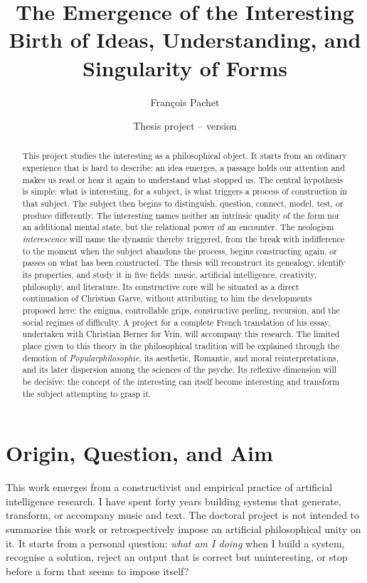 \documentclass[11pt,a4paper]{article}
\title{The Emergence of the Interesting\\
\large Birth of Ideas, Understanding, and Singularity of Forms}
\author{François Pachet}
\date{Thesis project -- version \projectversion\\\small \projectdate}
\begin{document}
\maketitle

\begin{abstract}
This project studies the interesting as a philosophical object. It
starts from an ordinary experience that is hard to describe: an idea emerges,
a passage holds our attention and makes us read or hear it again to understand
what stopped us. The central
hypothesis is simple: what is interesting, for a subject, is what triggers a
process of construction in that subject. The subject then begins to
distinguish, question, connect, model, test, or produce differently. The
interesting names neither an intrinsic quality of the form nor an additional
mental state, but the relational power of an encounter. The neologism
\emph{interescence} will name the dynamic thereby triggered, from the break with
indifference to the moment when the subject abandons the process, begins constructing
again, or passes on what has been constructed. The
thesis will reconstruct its genealogy, identify its properties, and study it
in five fields: music, artificial intelligence, creativity, philosophy, and
literature. Its constructive core will be situated as a direct continuation of
Christian Garve, without attributing to him the developments proposed here: the
enigma, controllable grips, constructive peeling, recursion, and the social
regimes of difficulty. A project for a complete French translation of
his essay, undertaken with Christian Berner for Vrin, will accompany this
research. The limited place given to this theory in the philosophical tradition
will be explained through the demotion of \emph{Popularphilosophie}, its
aesthetic, Romantic, and moral reinterpretations, and its later dispersion
among the sciences of the psyche.
Its reflexive dimension will be decisive: the concept of the interesting can
itself become interesting and transform the subject attempting to grasp it.
\end{abstract}

\section{Origin, Question, and Aim}

This work emerges from a constructivist and empirical practice of artificial
intelligence research. I have spent forty years building systems that generate,
transform, or accompany music and text. The doctoral project is not intended to
summarise this work or retrospectively impose an artificial philosophical unity
on it. It starts from a personal question: \emph{what am I doing} when I
build a system, recognise a solution, reject an output that is correct but
uninteresting, or stop before a form that seems to impose itself?
\end{document}
